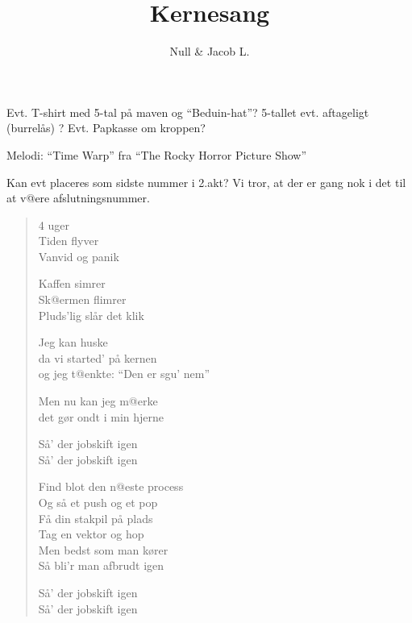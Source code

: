 \documentclass[a4paper,11pt]{article}
\begin{document}
\title{Kernesang}

\author{Null \& Jacob L.}



\maketitle

\begin{roles}
 Evt. T-shirt med 5-tal på maven og
``Beduin-hat''? 5-tallet evt. aftageligt (burrelås) ?
 Evt. Papkasse om kroppen?
\end{roles}

\begin{sketch}

Melodi: ``Time Warp'' fra ``The Rocky Horror Picture Show''

Kan evt placeres som sidste nummer i 2.akt? Vi tror, at der er gang
nok i det til at v@ere afslutningsnummer.

\begin{verse}

4 uger\\
Tiden flyver \\
Vanvid og panik

Kaffen simrer \\
Sk@ermen flimrer\\
Pluds'lig slår det klik

Jeg kan huske \\
da vi started' på kernen \\
og jeg t@enkte: ``Den er sgu' nem''

Men nu kan jeg m@erke \\
det gør ondt i min hjerne


Så' der jobskift igen \\
Så' der jobskift igen

Find blot den n@este process \\
Og så et push og et pop \\
Få din stakpil på plads \\
Tag en vektor og hop \\
Men bedst som man kører \\
Så bli'r man afbrudt igen

Så' der jobskift igen \\
Så' der jobskift igen



\end{verse}
\end{sketch}
\end{document}
